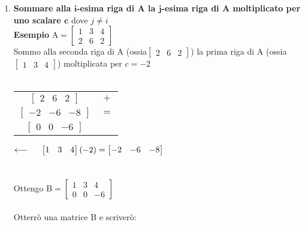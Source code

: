 \begin{enumerate} 
    \item \textbf{Sommare alla $\pmb{i}$-esima riga di A la $\pmb{j}$-esima riga di A
        moltiplicato per uno scalare $\pmb{c}$}
        {\color{red}
            dove $j\neq i$
        }
        \\
        \textbf{Esempio} A$=
        \begin{bmatrix}
            1 & 3 & 4\\
            2 & 6 & 2
        \end{bmatrix}$\\
        Sommo alla seconda riga di A (ossia$
        \begin{bmatrix}
            2 & 6 & 2
        \end{bmatrix}
        $) la prima riga di A (ossia $
        \begin{bmatrix}
            1 &  3 &  4
        \end{bmatrix}
        $) moltiplicata per $c=-2$\\\\
        \begin{tabular}{c c}
            $
            \begin{bmatrix}
                2 & 6 & 2
            \end{bmatrix}
            $ & $+$ \\
            $
            \begin{bmatrix}
                -2 & -6 & -8
            \end{bmatrix}
            $ & $=$\\
            \hline
            $
            \begin{bmatrix}
                0 & 0 & -6
            \end{bmatrix}
            $
        \end{tabular}
        \hspace{0.5cm}
        $\longleftarrow
        \hspace{0.5cm}
        \begin{bmatrix}
            1 & 3 & 4
        \end{bmatrix}
        (-2)=
        \begin{bmatrix}
            -2 & -6 & -8
        \end{bmatrix}
        $\\\\\\
        Ottengo B$=
        \begin{bmatrix}
            1 & 3 & 4\\
            0 & 0 & -6
        \end{bmatrix}
        $\\\\
        Otterrò una matrice B e scriverò:\\


\end{enumerate}
